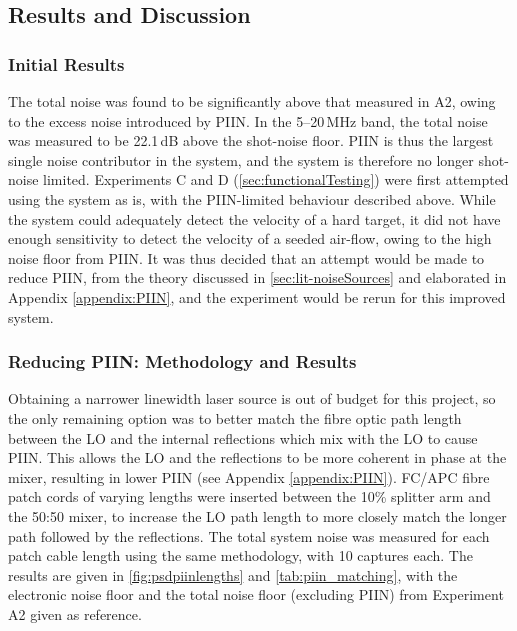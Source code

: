 \subsection{Results and Discussion}

\subsubsection{Initial Results}
The total noise was found to be significantly above that measured in A2, owing to the excess noise introduced by PIIN. In the 5--20\,MHz band, the total noise was measured to be 22.1\,dB above the shot-noise floor. PIIN is thus the largest single noise contributor in the system, and the system is therefore no longer shot-noise limited. Experiments C and D (\autoref{sec:functionalTesting}) were first attempted using the system as is, with the PIIN-limited behaviour described above. While the system could adequately detect the velocity of a hard target, it did not have enough sensitivity to detect the velocity of a seeded air-flow, owing to the high noise floor from PIIN. It was thus decided that an attempt would be made to reduce PIIN, from the theory discussed in \autoref{sec:lit-noiseSources} and elaborated in Appendix \ref{appendix:PIIN}, and the experiment would be rerun for this improved system. 

\subsubsection{Reducing PIIN: Methodology and Results}
\label{sec:reducing_piin}
 Obtaining a narrower linewidth laser source is out of budget for this project, so the only remaining option was to better match the fibre optic path length between the LO and the internal reflections which mix with the LO to cause PIIN. This allows the LO and the reflections to be more coherent in phase at the mixer, resulting in lower PIIN (see Appendix \ref{appendix:PIIN}). FC/APC fibre patch cords of varying lengths were inserted between the 10\% splitter arm and the 50:50 mixer, to increase the LO path length to more closely match the longer path followed by the reflections. The total system noise was measured for each patch cable length using the same methodology, with 10 captures each. The results are given in \autoref{fig:psdpiinlengths} and \autoref{tab:piin_matching}, with the electronic noise floor and the total noise floor (excluding PIIN) from Experiment A2 given as reference.

